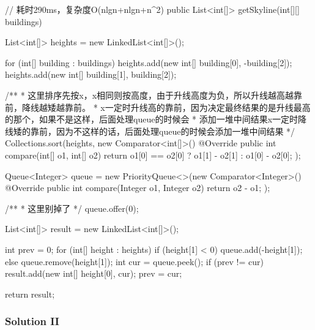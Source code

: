 \begin{Code}
// 耗时290ms，复杂度O(nlgn+nlgn+n^2)
public List<int[]> getSkyline(int[][] buildings) {
    List<int[]> heights = new LinkedList<int[]>();

    for (int[] building : buildings) {
        heights.add(new int[] {building[0], -building[2]});
        heights.add(new int[] {building[1], building[2]});
    }

    /**
     * 这里排序先按x，x相同则按高度，由于升线高度为负，所以升线越高越靠前，降线越矮越靠前。
     * x一定时升线高的靠前，因为决定最终结果的是升线最高的那个，如果不是这样，后面处理queue的时候会
     * 添加一堆中间结果x一定时降线矮的靠前，因为不这样的话，后面处理queue的时候会添加一堆中间结果
     */
    Collections.sort(heights, new Comparator<int[]>() {
        @Override
        public int compare(int[] o1, int[] o2) {
            return o1[0] == o2[0] ? o1[1] - o2[1] : o1[0] - o2[0];
        }
    });

    Queue<Integer> queue = new PriorityQueue<>(new Comparator<Integer>() {
        @Override
        public int compare(Integer o1, Integer o2) {
            return o2 - o1;
        }
    });

    /**
     * 这里别掉了
     */
    queue.offer(0);

    List<int[]> result = new LinkedList<int[]>();

    int prev = 0;
    for (int[] height : heights) {
        if (height[1] < 0) {
            queue.add(-height[1]);
        } else {
            queue.remove(height[1]);
        }
        int cur = queue.peek();
        if (prev != cur) {
            result.add(new int[] {height[0], cur});
            prev = cur;
        }
    }

    return result;
}
\end{Code}

\newpage

\subsubsection{Solution II}

